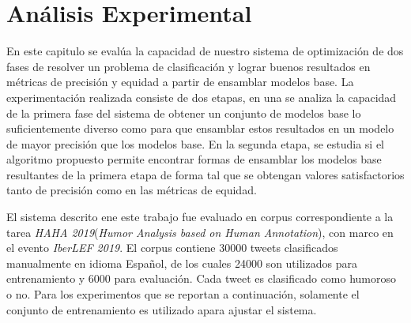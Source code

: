 \chapter{Análisis Experimental}\label{chapter:experiments}

En este capitulo se evalúa la capacidad de nuestro sistema de optimización de dos fases de resolver un problema de clasificación y lograr buenos resultados en métricas de precisión y equidad a partir de ensamblar modelos base. La experimentación realizada consiste de dos etapas, en una se analiza la capacidad de la primera fase del sistema de obtener un conjunto de modelos base lo suficientemente diverso como para que ensamblar estos resultados en un modelo de mayor precisión que los modelos base. En la segunda etapa, se estudia si el algoritmo propuesto permite encontrar formas de ensamblar los modelos base resultantes de la primera etapa de forma tal que se obtengan valores satisfactorios tanto de precisión como en las métricas de equidad.

El sistema descrito ene este trabajo fue evaluado en corpus correspondiente a la tarea \emph{HAHA 2019}(\textit{Humor Analysis based on Human Annotation}), con marco en el evento \emph{IberLEF 2019}. El corpus contiene 30000 tweets clasificados manualmente en idioma Español, de los cuales 24000 son utilizados para entrenamiento y 6000 para evaluación. Cada tweet es clasificado como humoroso o no. Para los experimentos que se reportan a continuación, solamente el conjunto de entrenamiento es utilizado apara ajustar el sistema.

%
%
%
%
%
%
%
%
